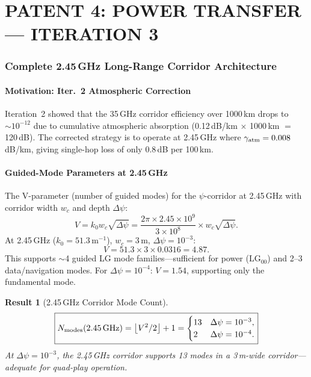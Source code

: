 \documentclass[aps,prd,twocolumn,superscriptaddress]{revtex4-2}
\newcommand{\LG}{\mathrm{LG}}
\newtheorem{result}{Result}
\begin{document}
\part*{PATENT 4: POWER TRANSFER --- ITERATION 3}


\section{Complete 2.45\,GHz Long-Range Corridor Architecture}
\label{sec:2p45GHz}

\subsection{Motivation: Iter.~2 Atmospheric Correction}

Iteration~2 showed that the 35\,GHz corridor efficiency over 1000\,km
drops to $\sim 10^{-12}$ due to cumulative atmospheric absorption
(0.12\,dB/km $\times$ 1000\,km $=$ 120\,dB).  The corrected strategy
is to operate at 2.45\,GHz where $\gamma_{\rm atm} = 0.008$\,dB/km,
giving single-hop loss of only 0.8\,dB per 100\,km.

\subsection{Guided-Mode Parameters at 2.45\,GHz}

The V-parameter (number of guided modes) for the $\psi$-corridor at
2.45\,GHz with corridor width $w_c$ and depth $\Delta\psi$:
\begin{equation}
V = k_0 w_c \sqrt{\Delta\psi}
= \frac{2\pi\times 2.45\times10^9}{3\times10^8}\times w_c\sqrt{\Delta\psi}.
\end{equation}
At 2.45\,GHz ($k_0 = 51.3\,\text{m}^{-1}$), $w_c = 3$\,m,
$\Delta\psi = 10^{-3}$:
\begin{equation}
V = 51.3\times3\times0.0316 = 4.87.
\end{equation}
This supports $\sim$4 guided LG mode families---sufficient for
power ($\LG_{00}$) and 2--3 data/navigation modes.  For $\Delta\psi = 10^{-4}$:
$V = 1.54$, supporting only the fundamental mode.

\begin{result}[2.45\,GHz Corridor Mode Count]
\begin{equation}
\boxed{
N_{\rm modes}(2.45\,\text{GHz}) = \left\lfloor V^2/2 \right\rfloor + 1
= \begin{cases}
13 & \Delta\psi = 10^{-3},\\
2 & \Delta\psi = 10^{-4}.
\end{cases}
}
\label{eq:mode-count-245}
\end{equation}
At $\Delta\psi = 10^{-3}$, the 2.45\,GHz corridor supports 13 modes
in a 3\,m-wide corridor---adequate for quad-play operation.
\end{result}
\end{document}

